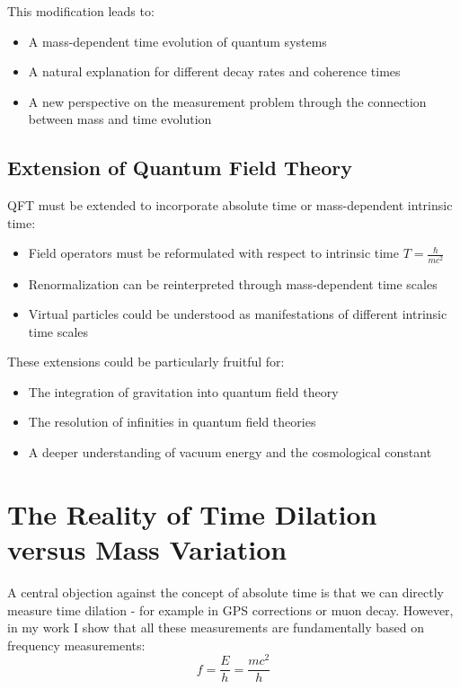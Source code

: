 \documentclass[a4paper,12pt]{article}
\begin{document}
	This modification leads to:
	\begin{itemize}
		\item A mass-dependent time evolution of quantum systems
		\item A natural explanation for different decay rates and coherence times
		\item A new perspective on the measurement problem through the connection between mass and time evolution
	\end{itemize}
	
	\subsection{Extension of Quantum Field Theory}
	
	QFT must be extended to incorporate absolute time or mass-dependent intrinsic time:
	
	\begin{itemize}
		\item Field operators must be reformulated with respect to intrinsic time $T = \frac{\hbar}{mc^2}$
		\item Renormalization can be reinterpreted through mass-dependent time scales
		\item Virtual particles could be understood as manifestations of different intrinsic time scales
	\end{itemize}
	
	These extensions could be particularly fruitful for:
	\begin{itemize}
		\item The integration of gravitation into quantum field theory
		\item The resolution of infinities in quantum field theories
		\item A deeper understanding of vacuum energy and the cosmological constant
	\end{itemize}
	
	\section{The Reality of Time Dilation versus Mass Variation}
	
	A central objection against the concept of absolute time is that we can directly measure time dilation - for example in GPS corrections or muon decay. However, in my work I show that all these measurements are fundamentally based on frequency measurements:
	\begin{equation}
		f = \frac{E}{h} = \frac{mc^2}{h}
	\end{equation}
	
\end{document}
